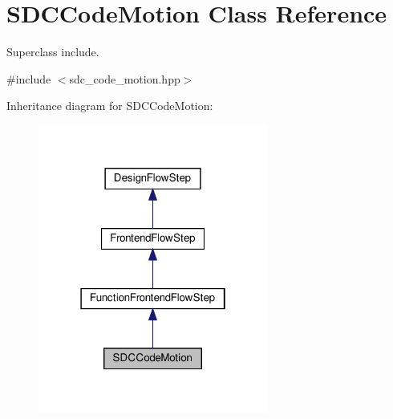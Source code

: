 \hypertarget{classSDCCodeMotion}{}\section{S\+D\+C\+Code\+Motion Class Reference}
\label{classSDCCodeMotion}


Superclass include.  




{\ttfamily \#include $<$sdc\+\_\+code\+\_\+motion.\+hpp$>$}



Inheritance diagram for S\+D\+C\+Code\+Motion\+:
\nopagebreak
\begin{figure}[H]
\begin{center}
\leavevmode
\includegraphics[width=214pt]{d1/d10/classSDCCodeMotion__inherit__graph}
\end{center}
\end{figure}


